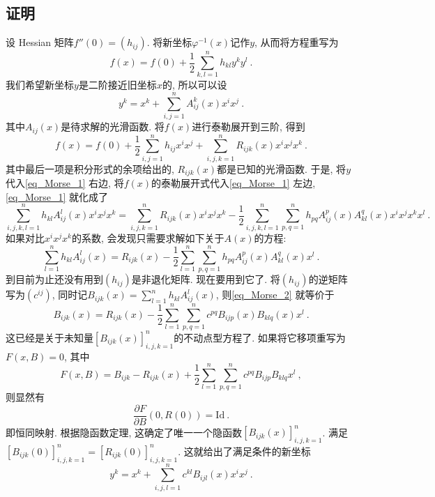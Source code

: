 \subsection{证明}
设 Hessian 矩阵$f''(0)=(h_{ij})$. 将新坐标$\varphi^{-1}(x)$记作$y$, 从而将方程重写为
\begin{equation}\label{eq_Morse_1}
f(x)=f(0)+\frac{1}{2}\sum_{k,l=1}^nh_{kl}y^ky^l~.
\end{equation}
我们希望新坐标$y$是二阶接近旧坐标$x$的, 所以可以设
$$
y^k
=x^k+\sum_{i,j=1}^nA^k_{ij}(x)x^ix^j~.
$$
其中$A_{ij}(x)$是待求解的光滑函数. 将$f(x)$进行泰勒展开到三阶, 得到
$$
f(x)=f(0)+\frac{1}{2}\sum_{i,j=1}^nh_{ij}x^ix^j+
\sum_{i,j,k=1}^nR_{ijk}(x)x^ix^jx^k~.
$$
其中最后一项是积分形式的余项给出的, $R_{ijk}(x)$都是已知的光滑函数. 于是, 将$y$代入\autoref{eq_Morse_1} 右边, 将$f(x)$的泰勒展开式代入\autoref{eq_Morse_1} 左边, \autoref{eq_Morse_1} 就化成了
$$
\sum_{i,j,k,l=1}^nh_{kl}A^l_{ij}(x)x^ix^jx^k
=\sum_{i,j,k=1}^nR_{ijk}(x)x^ix^jx^k
-\frac{1}{2}\sum_{i,j,k,l=1}^n\sum_{p,q=1}^nh_{pq}A^p_{ij}(x)A^q_{kl}(x)x^ix^jx^kx^l~.
$$
如果对比$x^ix^jx^k$的系数, 会发现只需要求解如下关于$A(x)$的方程:
\begin{equation}\label{eq_Morse_2}
\sum_{l=1}^nh_{kl}A^l_{ij}(x)
=R_{ijk}(x)
-\frac{1}{2}\sum_{l=1}^n\sum_{p,q=1}^nh_{pq}A^p_{ij}(x)A^q_{kl}(x)x^l~.
\end{equation}
到目前为止还没有用到$(h_{ij})$是非退化矩阵. 现在要用到它了. 将$(h_{ij})$的逆矩阵写为$(c^{ij})$, 同时记$B_{ijk}(x)=\sum_{l=1}^nh_{kl}A^l_{ij}(x)$, 则\autoref{eq_Morse_2} 就等价于
$$
B_{ijk}(x)
=R_{ijk}(x)-\frac{1}{2}\sum_{l=1}^n\sum_{p,q=1}^nc^{pq}B_{ijp}(x)B_{klq}(x)x^l~.
$$
这已经是关于未知量$[B_{ijk}(x)]_{i,j,k=1}^n$的不动点型方程了. 如果将它移项重写为$F(x,B)=0$, 其中
$$
F(x,B)=B_{ijk}-R_{ijk}(x)+\frac{1}{2}\sum_{l=1}^n\sum_{p,q=1}^nc^{pq}B_{ijp}B_{klq}x^l~,
$$
则显然有
$$
\frac{\partial F}{\partial B}(0,R(0))=\mathrm{Id}~.
$$
即恒同映射. 根据隐函数定理, 这确定了唯一一个隐函数$[B_{ijk}(x)]_{i,j,k=1}^n$. 满足$[B_{ijk}(0)]_{i,j,k=1}^n=[R_{ijk}(0)]_{i,j,k=1}^n$. 这就给出了满足条件的新坐标
$$
y^k
=x^k+\sum_{i,j,l=1}^nc^{kl}B_{ijl}(x)x^ix^j~.
$$ 

